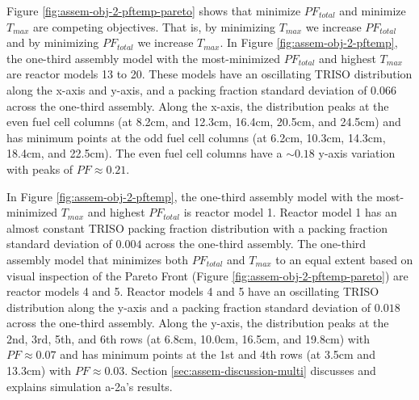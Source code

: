 Figure \ref{fig:assem-obj-2-pftemp-pareto} shows that minimize $PF_{total}$ and 
minimize $T_{max}$ are competing objectives. 
That is, by minimizing $T_{max}$ we increase $PF_{total}$ and by minimizing 
$PF_{total}$ we increase $T_{max}$. 
In Figure \ref{fig:assem-obj-2-pftemp}, the one-third assembly model with the 
most-minimized $PF_{total}$ and highest $T_{max}$ are reactor models 13 to 20. 
These models have an oscillating TRISO distribution along the 
x-axis and y-axis, and a packing fraction standard deviation of $0.066$ across the 
one-third assembly. 
Along the x-axis, the distribution peaks at the even fuel cell columns (at 8.2cm,  
and 12.3cm, 16.4cm, 20.5cm, and 24.5cm) and has minimum points at the odd fuel cell 
columns (at 6.2cm, 10.3cm, 14.3cm, 18.4cm, and 22.5cm).
The even fuel cell columns have a ${\sim}0.18$ y-axis variation with peaks of 
$PF\approx0.21$. 

In Figure \ref{fig:assem-obj-2-pftemp}, the one-third assembly model with the 
most-minimized $T_{max}$ and highest $PF_{total}$ is reactor model 1. 
Reactor model 1 has an almost constant TRISO packing fraction distribution with 
a packing fraction standard deviation of $0.004$ across the one-third assembly. 
The one-third assembly model that minimizes both $PF_{total}$ and $T_{max}$ 
to an equal extent based on visual inspection of the Pareto Front (Figure 
\ref{fig:assem-obj-2-pftemp-pareto}) are reactor models 4 and 5. 
Reactor models 4 and 5 have an oscillating TRISO distribution along the y-axis and 
a packing fraction standard deviation of $0.018$ across the one-third assembly. 
Along the y-axis, the distribution peaks at the 2nd, 3rd, 5th, and 6th rows 
(at 6.8cm, 10.0cm, 16.5cm, and 19.8cm) with $PF\approx0.07$ and has minimum points at 
the 1st and 4th rows (at 3.5cm and 13.3cm) with $PF\approx0.03$. 
Section \ref{sec:assem-discussion-multi} discusses and explains simulation a-2a's 
results.

